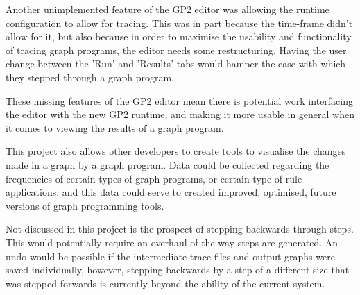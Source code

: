 \documentclass{UoYCSproject}
\begin{document}
Another unimplemented feature of the GP2 editor was allowing the runtime configuration to allow for tracing. This was in part because the time-frame didn't allow for it, but also because in order to maximise the usability and functionality of tracing graph programs, the editor needs some restructuring. Having the user change between the 'Run' and 'Results' tabs would hamper the ease with which they stepped through a graph program. 

These missing features of the GP2 editor mean there is potential work interfacing the editor with the new GP2 runtime, and making it more usable in general when it comes to viewing the results of a graph program.

This project also allows other developers to create tools to visualise the changes made in a graph by a graph program. Data could be collected regarding the frequencies of certain types of graph programs, or certain type of rule applications, and this data could serve to created improved, optimised, future versions of graph programming tools. 

Not discussed in this project is the prospect of stepping backwards through steps. This would potentially require an overhaul of the way steps are generated. An undo would be possible if the intermediate trace files and output graphs were saved individually, however, stepping backwards by a step of a different size that was stepped forwards is currently beyond the ability of the current system.


\end{document}
